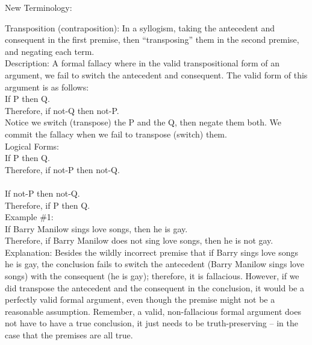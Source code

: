 \documentclass[a4paper,12pt,single,pdftex]{scrbook}
\begin{document}
  
    New Terminology:

    
      Transposition (contraposition): In a syllogism, taking the antecedent and consequent in the first premise, then “transposing” them in the second premise, and negating each term.
    \\

    
      Description: A formal fallacy where in the valid transpositional form of an argument, we fail to switch the antecedent and consequent.  The valid form of this argument is as follows:
    \\

    
      If P then Q.
    \\

    
      Therefore, if not-Q then not-P.
    \\

    
      Notice we switch (transpose) the P and the Q, then negate them both.  We commit the fallacy when we fail to transpose (switch) them.
    \\

    
      Logical Forms:
    \\

    
      If P then Q.
    \\

    
      Therefore, if not-P then not-Q.
    \\

    
       
    \\

    
      If not-P then not-Q.
    \\

    
      Therefore, if P then Q.
    \\

    
      Example \#1:
    \\

    
      If Barry Manilow sings love songs, then he is gay.
    \\

    
      Therefore, if Barry Manilow does not sing love songs, then he is not gay.
    \\

    
      Explanation: Besides the wildly incorrect premise that if Barry sings love songs he is gay, the conclusion fails to switch the antecedent (Barry Manilow sings love songs) with the consequent (he is gay); therefore, it is fallacious.  However, if we did transpose the antecedent and the consequent in the conclusion, it would be a perfectly valid formal argument, even though the premise might not be a reasonable assumption.  Remember, a valid, non-fallacious formal argument does not have to have a true conclusion, it just needs to be truth-preserving -- in the case that the premises are all true.
    \\
\end{document}
